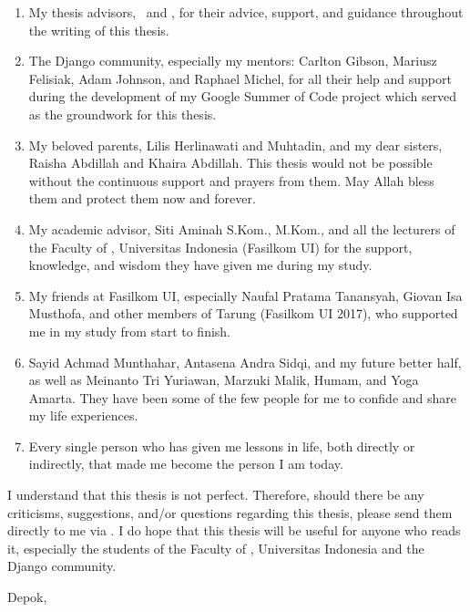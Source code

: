 \begin{enumerate}
    \item My thesis advisors, \pembimbingSatu\ and \pembimbingDua, for their
          advice, support, and guidance throughout the writing of this thesis.
    \item The Django community, especially my mentors: Carlton Gibson, Mariusz
          Felisiak, Adam Johnson, and Raphael Michel, for all their help and
          support during the development of my Google Summer of Code project
          which served as the groundwork for this thesis.
    \item My beloved parents, Lilis Herlinawati and Muhtadin, and my dear
          sisters, Raisha Abdillah and Khaira Abdillah. This thesis would not
          be possible without the continuous support and prayers from them. May
          Allah bless them and protect them now and forever.
    \item My academic advisor, Siti Aminah S.Kom., M.Kom., and all the
          lecturers of the Faculty of \fakultas, Universitas Indonesia
          (Fasilkom UI) for the support, knowledge, and wisdom they have given
          me during my study.
    \item My friends at Fasilkom UI, especially Naufal Pratama Tanansyah,
          Giovan Isa Musthofa, and other members of Tarung (Fasilkom UI 2017),
          who supported me in my study from start to finish.
    \item Sayid Achmad Munthahar, Antasena Andra Sidqi, and my future better
          half, as well as Meinanto Tri Yuriawan, Marzuki Malik, Humam, and
          Yoga Amarta. They have been some of the few people for me to confide
          and share my life experiences.
    \item Every single person who has given me lessons in life, both directly
          or indirectly, that made me become the person I am today.
\end{enumerate}

I understand that this thesis is not perfect. Therefore, should there be any
criticisms, suggestions, and/or questions regarding this thesis, please send
them directly to me via
. I do hope
that this thesis will be useful for anyone who reads it, especially the
students of the Faculty of \fakultas, Universitas Indonesia and the Django
community.

\vspace*{0.1cm}
\begin{flushright}
Depok, \tanggalSiapSidang\\[0.1cm]
\vspace*{1.5cm}
\penulis

\end{flushright}
